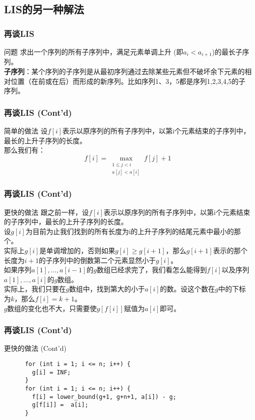 \documentclass[hyperref={unicode=true}]{beamer}
\theoremstyle{definition}
\theoremstyle{proof}
\begin{document}
\subsection{LIS的另一种解法}
\begin{frame}\frametitle{再谈LIS}
  \begin{block}{问题}
    求出一个序列的所有子序列中，满足元素单调上升 (即$a_i<a_{i+1}$)的最长子序列。\\
    {\bf 子序列}：某个序列的子序列是从最初序列通过去除某些元素但不破坏余下元素的相对位置（在前或在后）而形成的新序列。比如序列{1}、{3，5}都是序列{1,2,3,4,5}的子序列。
  \end{block}
\end{frame}
\begin{frame}\frametitle{再谈LIS (Cont'd)}
  \begin{alertblock}{简单的做法}
    设$f[i]$表示以原序列的所有子序列中，以第i个元素结束的子序列中，最长的上升子序列的长度。\\
    那么我们有：
    \[f[i] = \max_{\substack{1 \leq j < i\\ a[j] < a[i]}}f[j]+1\]
  \end{alertblock}
\end{frame}
\begin{frame}\frametitle{再谈LIS (Cont'd)}
  \begin{exampleblock}{更快的做法}
    跟之前一样，设$f[i]$表示以原序列的所有子序列中，以第i个元素结束的子序列中，最长的上升子序列的长度。\\
    设$g[i]$为目前为止我们找到的所有长度为i的上升子序列的结尾元素中最小的那个。\\
    实际上$g[i]$是单调增加的，否则如果$g[i]\geq g[i+1]$，那么$g[i+1]$表示的那个长度为$i+1$的子序列中的倒数第二个元素显然小于$g[i]$。\\
    \pause{}如果序列$a[1],\ldots,a[i-1]$的$g$数组已经求完了，我们看怎么能得到$f[i]$以及序列$a[1],\ldots,a[i]$的$g$数组。\\
    实际上，我们只要在$g$数组中，找到第大的小于$a[i]$的数。设这个数在$g$中的下标为$k$，那么$f[i]=k+1$。\\
    $g$数组的变化也不大，只需要使$g[f[i]]$赋值为$a[i]$即可。
  \end{exampleblock}
\end{frame}
\begin{frame}[fragile]\frametitle{再谈LIS (Cont'd)}
  \begin{exampleblock}{更快的做法 (Cont'd)}
    \begin{verbatim}
      for (int i = 1; i <= n; i++) {
        g[i] = INF;
      }
      for (int i = 1; i <= n; i++) {
        f[i] = lower_bound(g+1, g+n+1, a[i]) - g;
        g[f[i]] =  a[i];
      }
    \end{verbatim}
  \end{exampleblock}
\end{frame}
\end{document}
